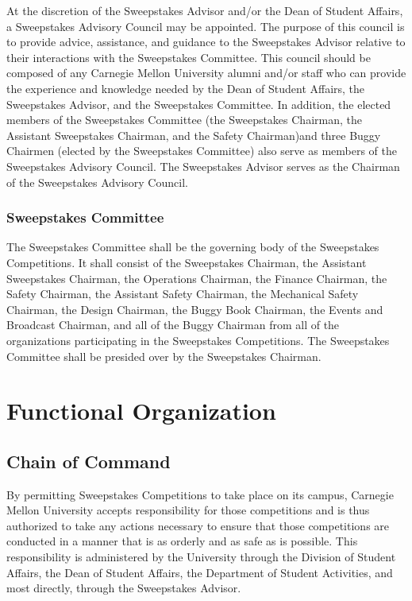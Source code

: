	At the discretion of the Sweepstakes Advisor and/or the Dean of Student Affairs, a Sweepstakes Advisory Council may be appointed. The purpose of this council is to provide advice, assistance, and guidance to the Sweepstakes Advisor relative to their interactions with the Sweepstakes Committee. This council should be composed of any Carnegie Mellon University alumni and/or staff who can provide the experience and knowledge needed by the Dean of Student Affairs, the Sweepstakes Advisor, and the Sweepstakes Committee. In addition, the elected members of the Sweepstakes Committee (the Sweepstakes Chairman, the Assistant Sweepstakes Chairman, and the Safety Chairman)and three Buggy Chairmen (elected by the Sweepstakes Committee) also serve as members of the Sweepstakes Advisory Council. The Sweepstakes Advisor serves as the Chairman of the Sweepstakes Advisory Council.

\subsubsection{Sweepstakes Committee}

	The Sweepstakes Committee shall be the governing body of the Sweepstakes Competitions. It shall consist of the Sweepstakes Chairman, the Assistant Sweepstakes Chairman, the Operations Chairman, the Finance Chairman, the Safety Chairman, the Assistant Safety Chairman, the Mechanical Safety Chairman, the Design Chairman, the Buggy Book Chairman, the Events and Broadcast Chairman, and all of the Buggy Chairman from all of the organizations participating in the Sweepstakes Competitions. The Sweepstakes Committee shall be presided over by the Sweepstakes Chairman.

\section{Functional Organization}

\subsection{Chain of Command}

	By permitting Sweepstakes Competitions to take place on its campus, Carnegie Mellon University accepts responsibility for those competitions and is thus authorized to take any actions necessary to ensure that those competitions are conducted in a manner that is as orderly and as safe as is possible. This responsibility is administered by the University through the Division of Student Affairs, the Dean of Student Affairs, the Department of Student Activities, and most directly, through the Sweepstakes Advisor.

